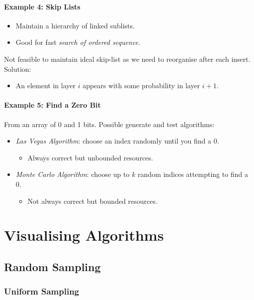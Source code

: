 \documentclass[twocolumn,english]{article}
\begin{document}
\paragraph{Example 4: Skip Lists}
\begin{itemize}
\item Maintain a hierarchy of linked sublists.
\item Good for fast \emph{search of ordered sequence}.
\end{itemize}
Not feasible to maintain ideal skip-list as we need to reorganise
after each insert. Solution:
\begin{itemize}
\item An element in layer $i$ appears with some probability in layer $i+1$.
\end{itemize}

\paragraph{Example 5: Find a Zero Bit}

From an array of 0 and 1 bits. Possible generate and test algorithms:
\begin{itemize}
\item \emph{Las Vegas Algorithm}: choose an index randomly until you find
a 0.
\begin{itemize}
\item Always correct but unbounded resources.
\end{itemize}
\item \emph{Monte Carlo Algorithm}: choose up to $k$ random indices attempting
to find a 0.
\begin{itemize}
\item Not always correct but bounded resources.
\end{itemize}
\end{itemize}

\section{Visualising Algorithms}

\subsection{Random Sampling}

\subsubsection*{Uniform Sampling}
\end{document}
